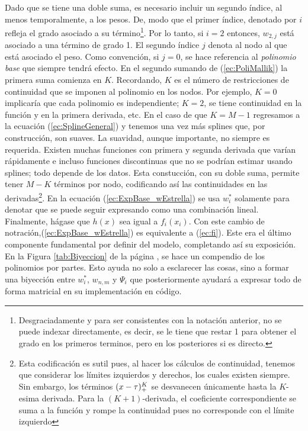 \documentclass[../Main/Main.tex]{subfiles}
\begin{document}
Dado que se tiene una doble suma, es necesario incluir un segundo índice, al menos temporalmente, a los pesos. De, modo que el primer índice, denotado por $i$ refleja el grado asociado a su término\footnote{Desgraciadamente y para ser consistentes con la notación anterior, no se puede indexar directamente, es decir, se le tiene que restar 1 para obtener el grado en los primeros terminos, pero en los posteriores si es directo.}. Por lo tanto, si $i = 2$ entonces, $w_{2,j}$ está asociado a una término de grado 1. El segundo índice $j$ denota al nodo al que está asociado el peso. Como convención, si $j = 0$, se hace referencia al \textit{polinomio base} que siempre tendrá efecto. En el segundo sumando de (\ref{ec:PoliMallik}) la primera suma comienza en $K$. Recordando, $K$ es el número de restricciones de continuidad que se imponen al polinomio en los nodos. Por ejemplo, $K = 0$ implicaría que cada polinomio es independiente; $K = 2$, se tiene continuidad en la función y en la primera derivada, etc. En el caso de que $K = M-1$ regresamos a la ecuación (\ref{ec:SplineGeneral}) y tenemos una vez más splines que, por construcción, son suaves. La suavidad, aunque importante, no siempre es requerida. Existen muchas funciones con primera y segunda derivada que varían rápidamente e incluso funciones discontinuas que no se podrían estimar usando splines; todo depende de los datos. Esta constucción, con su doble suma, permite tener $M-K$ términos por nodo, codificando así las continuidades en las derivadas\footnote{Esta codificación es sutil pues, al hacer los cálculos de continuidad, tenemos que considerar los límites izquierdos y derechos, los cuales existen siempre. Sin embargo, los términos $(x-\tau)^K_+$ se desvanecen únicamente hasta la $K$-esima derivada. Para la $(K+1)$-derivada, el coeficiente correspondiente se suma a la función y rompe la continuidad pues no corresponde con el límite izquierdo}. En la ecuación (\ref{ec:ExpBase_wEstrella}) se usa $w_i^*$ solamente para denotar que se puede seguir expresando como una combinación lineal. Finalmente, hágase que $h(x)$ sea igual a $f_i(x_i)$. Con este cambio de notración,(\ref{ec:ExpBase_wEstrella}) es equivalente a (\ref{ec:fi}). Este era el último componente fundamental por definir del modelo, completando así su exposición.\\

En la Figura \ref{tab:Biyeccion} de la página \pageref{tab:Biyeccion}, se hace un compendio de los polinomios por partes. Esto ayuda no solo a esclarecer las cosas, sino a formar una biyección entre $w_i^*$, $w_{n,m}$ y $\Psi_i$ que posteriormente ayudará a expresar todo de forma matricial en su implementación en código.
\end{document}
